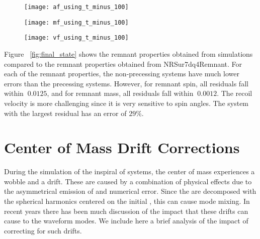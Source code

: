 \documentclass[
twocolumn,prd,
showpacs,
nofootinbib,
amsmath,amssymb,
superscriptaddress]{revtex4-1}
\begin{document}
\begin{figure*}
\centering
\begin{subfigure}{.3\textwidth}
    \centering
   \texttt{[image: af\_using\_t\_minus\_100]}
    \caption{ }
    \label{fig:remnant_af}
\end{subfigure}
\begin{subfigure}{.3\textwidth}
    \centering
    \texttt{[image: mf\_using\_t\_minus\_100]}
 	\caption{ }
 	\label{fig:remnant_mf}
\end{subfigure}
\begin{subfigure}{.3\textwidth}
    \centering
    \texttt{[image: vf\_using\_t\_minus\_100]}
 	\caption{ }
 	\label{fig:remnant_vf}
\end{subfigure}
\caption{Comparison of the properties of the remnant black hole computed from the \nr{} simulation and predicted by NRSur7dq4Remnant. The top panels show the remnant property as a function of mass ratio.  Non-precessing systems appear in blue and precessing systems appear in orange. The darker points show the \nr{} values and the lighter points show the model predictions. The points referring to the same systems are connected by black lines.  The bottom panel shows the residuals resulting from subtracting the model predicted value from the \nr{} value. The vertical lines are the uncertainty in the model predictions.}
\label{fig:final_state}
\end{figure*}

Figure ~\ref{fig:final_state} shows the remnant properties obtained from \nr{} simulations compared to the remnant properties obtained from NRSur7dq4Remnant.
For each of the remnant properties, the non-precessing systems have much lower errors than the precessing systems.
However, for remnant spin,  all residuals fall within $~0.0125$, and for remnant mass, all residuals fall within $~0.0012$.
The recoil velocity is more challenging since it is very sensitive to spin angles. 
The system with the largest residual has an error of $29\%$.

\section{Center of Mass Drift Corrections}\label{sec:com_correction}

During the \nr{} simulation of the  inspiral of \bbh{} systems, the center of mass experiences a wobble and a drift. 
These are caused by a combination of physical effects due to the asymmetrical emission of  and numerical error.
Since the  are decomposed with the spherical harmonics centered on the initial \com{}, this can cause mode mixing.
In recent years there has been much discussion of the impact that these \com{} drifts can cause to the waveform modes.
We include here a brief analysis of the impact of correcting for such drifts.
\end{document}
